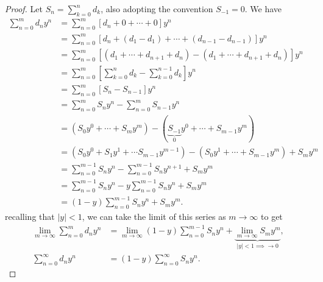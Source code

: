 \documentclass{article}
\theoremstyle{definition}
\begin{document}
\begin{proof}
	Let $ S_n = \sum_{k=0}^{n}d_k $, also adopting the convention  $ S_{-1}=0 $. We have 
	\begin{align*}
		\sum_{n=0}^{m}d_ny^n & = \sum_{n=0}^{m}\left[d_n + 0 + \cdots + 0\right]y^n \\
												& =  \sum_{n=0}^{m}\left[d_n + (d_1 - d_1) + \cdots + (d_{n-1} - d_{n-1})\right]y^n \\
												& =  \sum_{n=0}^{m}\left[(d_1 + \cdots + d_{n+1} + d_n)- (d_1 + \cdots + d_{n+1} + d_n)\right]y^n\\
												& =  \sum_{n=0}^{m}\left[\sum_{k=0}^{n}d_k - \sum_{k=0}^{n-1}d_k\right]y^n\\
												& =  \sum_{n=0}^{m}\left[S_n - S_{n-1}\right]y^n\\
												& =  \sum_{n=0}^{m}S_ny^n - \sum_{n=0}^{m}S_{n-1}y^n\\
													& =  \left(S_0y^0 + \cdots + S_my^m\right) - (\underbrace{S_{-1}}_0y^0 + \cdots + S_{m-1}y^m)\\
													&= \left(S_0y^0 + S_1y^1 + \cdots S_{m-1}y^{m-1} \right) - (S_0y^1+ \cdots + S_{m-1}y^m) + S_my^m\\ 
													&= \sum_{n=0}^{m-1}S_ny^n - \sum_{n=0}^{m-1}S_ny^{n+1} + S_my^m\\
													&= \sum_{n=0}^{m-1}S_ny^n - y\sum_{n=0}^{m-1}S_ny^{n} + S_my^m\\
													&= (1-y)\sum_{n=0}^{m-1}S_ny^n + S_my^m.
	\end{align*}
	recalling that $ |y|<1 $, we can take the limit of this series as $ m\to\infty $ to get 
	\begin{align*}
	\lim_{m\to \infty}	\sum_{n=0}^{m}d_ny^n &= \lim_{m\to \infty}(1-y)\sum_{n=0}^{m-1}S_ny^n +\underbrace{\lim_{m\to \infty} S_my^m}_{|y| < 1 \implies \to 0},\\
	\sum_{n=0}^{\infty}d_ny^n &= (1-y)\sum_{n=0}^{\infty}S_ny^n.
	\end{align*}


\end{proof}
\end{document}
